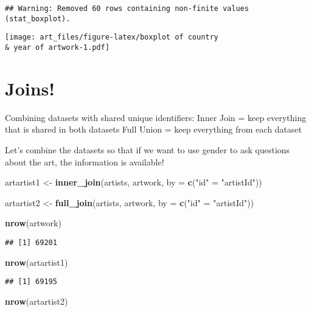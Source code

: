 \documentclass[]{article}
\newenvironment{Shaded}{\begin{snugshade}}{\end{snugshade}}
\newcommand{\DataTypeTok}[1]{\textcolor[rgb]{0.13,0.29,0.53}{#1}}
\newcommand{\KeywordTok}[1]{\textcolor[rgb]{0.13,0.29,0.53}{\textbf{#1}}}
\newcommand{\NormalTok}[1]{#1}
\newcommand{\StringTok}[1]{\textcolor[rgb]{0.31,0.60,0.02}{#1}}
\begin{document}
\begin{verbatim}
## Warning: Removed 60 rows containing non-finite values (stat_boxplot).
\end{verbatim}

\texttt{[image: art\_files/figure-latex/boxplot of country \\\& year of artwork-1.pdf]}

\hypertarget{joins}{%
\section{Joins!}\label{joins}}

Combining datasets with shared unique identifiers: Inner Join = keep
everything that is shared in both datasets Full Union = keep everything
from each dataset

Let's combine the datasets so that if we want to use gender to ask
questions about the art, the information is available!

\begin{Shaded}
\begin{Highlighting}[]
\NormalTok{artartist1 <-}\StringTok{ }
\StringTok{  }\KeywordTok{inner_join}\NormalTok{(artists, artwork, }\DataTypeTok{by =} \KeywordTok{c}\NormalTok{(}\StringTok{"id"}\NormalTok{ =}\StringTok{ "artistId"}\NormalTok{))}

\NormalTok{artartist2 <-}\StringTok{ }
\StringTok{  }\KeywordTok{full_join}\NormalTok{(artists, artwork, }\DataTypeTok{by =} \KeywordTok{c}\NormalTok{(}\StringTok{"id"}\NormalTok{ =}\StringTok{ "artistId"}\NormalTok{))}

\KeywordTok{nrow}\NormalTok{(artwork)}
\end{Highlighting}
\end{Shaded}

\begin{verbatim}
## [1] 69201
\end{verbatim}

\begin{Shaded}
\begin{Highlighting}[]
\KeywordTok{nrow}\NormalTok{(artartist1)}
\end{Highlighting}
\end{Shaded}

\begin{verbatim}
## [1] 69195
\end{verbatim}

\begin{Shaded}
\begin{Highlighting}[]
\KeywordTok{nrow}\NormalTok{(artartist2)}
\end{Highlighting}
\end{Shaded}
\end{document}
